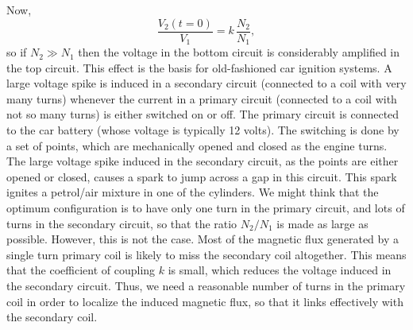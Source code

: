 Now,
\begin{equation}
\frac{V_2(t=0)}{V_1} = k\, \frac{N_2}{N_1},
\end{equation}
so if $N_2 \gg N_1$  then  the voltage in the bottom circuit is considerably amplified
in the top circuit. This effect is  the basis for  old-fashioned car ignition
systems. A large voltage spike is induced in a secondary circuit (connected to
a coil with very many turns) whenever the current in a primary circuit 
(connected to a coil with not so many turns) is either switched on or off.
The primary circuit is connected to the car battery (whose voltage is
typically 12 volts). 
The switching is done by a set of points, which are mechanically opened and
closed as the engine turns. The large voltage spike induced in the secondary circuit,
as the points are either opened or closed, causes a spark to jump across a gap
in this circuit. This spark ignites a petrol/air mixture in one of the cylinders. 
We might think that the optimum configuration is to have only one turn in the primary
circuit, and lots of turns in the secondary circuit, so that the ratio
$N_2/N_1$ is made as large as possible. However, this is not the case. Most of
the magnetic  flux generated by a single turn primary coil is likely to
miss the secondary coil altogether. This means that the coefficient of coupling $k$
is small, which reduces the voltage induced in the secondary circuit. Thus, we
need a reasonable number of turns in the primary coil in order to localize the
induced magnetic flux, so that it links effectively with the secondary coil.

